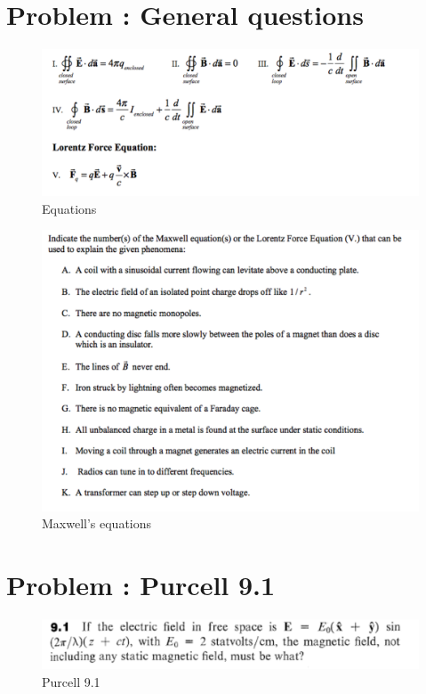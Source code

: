 \documentclass[problems]{esg8022pset}
\begin{document}
\section{Problem \thesection: General questions}
\begin{figure}[H]
    \centering
    \includegraphics[width = 15cm]{eqns}
    \caption{Equations}
  \end{figure}
\begin{figure}[H]
    \centering
    \includegraphics[width = 15cm]{max_gen}
    \caption{Maxwell's equations}
  \end{figure}
\section{Problem \thesection: Purcell 9.1}

\begin{figure}[H]
    \centering
    \includegraphics[width = 15cm]{pu901}
    \caption{Purcell 9.1}
  \end{figure}
  
\end{document}
